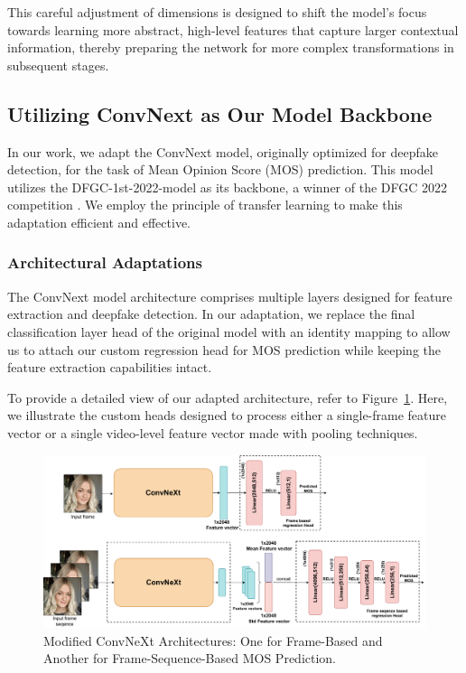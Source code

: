 \documentclass[a4paper,12pt,openright]{book}
\begin{document}
\begin{itemize}
This careful adjustment of dimensions is designed to shift the model's focus towards learning more abstract, high-level features that capture larger contextual information, thereby preparing the network for more complex transformations in subsequent stages.

\end{itemize}

\subsection{Utilizing ConvNext as Our Model Backbone}

In our work, we adapt the ConvNext model, originally optimized for deepfake detection, for the task of Mean Opinion Score (MOS) prediction. This model utilizes the DFGC-1st-2022-model as its backbone, a winner of the DFGC 2022 competition \cite{peng2022dfgc}. We employ the principle of transfer learning to make this adaptation efficient and effective.

\subsubsection{Architectural Adaptations}

The ConvNext model architecture comprises multiple layers designed for feature extraction and deepfake detection. In our adaptation, we replace the final classification layer head of the original model with an identity mapping to allow us to attach our custom regression head for MOS prediction while keeping the feature extraction capabilities intact.

To provide a detailed view of our adapted architecture, refer to Figure~\ref{fig:modified_convnext}. Here, we illustrate the custom heads designed to process either a single-frame feature vector or a single video-level feature vector made with pooling techniques.
\begin{figure}[h]
\centering
\includegraphics[width=1.1\textwidth]{images/convmy.drawio.pdf}
\caption{Modified ConvNeXt Architectures: One for Frame-Based and Another for Frame-Sequence-Based MOS Prediction.}\label{fig:modified_convnext}
\end{figure}
\end{document}
